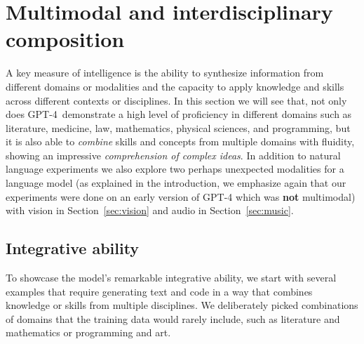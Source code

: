
\section{Multimodal and interdisciplinary composition}
\label{sec:see}

A key measure of intelligence is the ability to synthesize information from different domains or modalities and the capacity to apply knowledge and skills across different contexts or disciplines. In this section we will see that, not only does GPT-4\ demonstrate a high level of proficiency in different domains such as literature, medicine, law, mathematics, physical sciences, and programming, but it is also able to \emph{combine} skills and concepts from multiple domains with fluidity, showing an impressive {\em comprehension of complex ideas}. In addition to natural language experiments we also explore two perhaps unexpected modalities for a language model (as explained in the introduction, we emphasize again that our experiments were done on an early version of GPT-4 which was \textbf{not} multimodal) with vision in Section~\ref{sec:vision} and audio in Section~\ref{sec:music}.

\subsection{Integrative ability}\label{sec:interdisc}
To showcase the model's remarkable integrative ability, we start with several examples that require generating text and code in a way that combines knowledge or skills from multiple disciplines. We deliberately picked combinations of domains that the training data would rarely include, such as literature and mathematics or programming and art.

